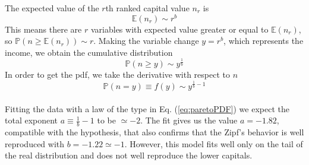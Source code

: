 The expected value of the $r$th ranked capital value $n_r$ is
\begin{equation*}
    \mathbb{E}(n_r)\sim r^b
\end{equation*}
This means there are $r$ variables with expected value greater or equal to $\mathbb{E}(n_r)$, so $\mathbb{P}(n \geq \mathbb{E}(n_r)) \sim r$.
Making the variable change $y=r^b$, which represents the income, we obtain the cumulative distribution
\begin{equation*}
    \mathbb{P}(n \geq y) \sim y^{\frac{1}{b}}
\end{equation*}
In order to get the pdf, we take the derivative with respect to $n$
\begin{equation}
    \mathbb{P}(n = y) \equiv f(y) \sim y^{\frac{1}{b} - 1}
    \label{eq:paretoPDF}
\end{equation}
\\Fitting the data with a law of the type in Eq. (\ref{eq:paretoPDF}) we expect the total exponent $a \equiv \frac{1}{b} - 1$ to be $\simeq -2$.
The fit gives us the value $a = -1.82$, compatible with the hypothesis, that also confirms that the Zipf's behavior is well reproduced with $b = -1.22 \simeq -1$.
However, this model fits well only on the tail of the real distribution and does not well reproduce the lower capitals.
